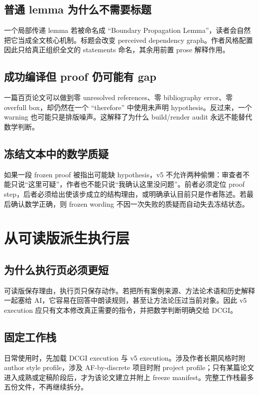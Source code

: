 \documentclass[UTF8,fontset=none,12pt,openany]{ctexbook}
\begin{document}
\section{普通 lemma 为什么不需要标题}

一个局部传递 lemma 若被命名成 “Boundary Propagation Lemma”，读者会自然把它当成全文核心机制。标题会改变 perceived dependency graph。作者风格配置因此只给真正组织全文的 statements 命名，其余用前置 prose 解释作用。

\section{成功编译但 proof 仍可能有 gap}

一篇百页论文可以做到零 unresolved references、零 bibliography error、零 overfull box，却仍然在一个 “therefore” 中使用未声明 hypothesis。反过来，一个 warning 也可能只是排版噪声。这解释了为什么 build/render audit 永远不能替代数学判断。

\section{冻结文本中的数学质疑}

如果一段 frozen proof 被指出可能缺 hypothesis，v5 不允许两种偷懒：审查者不能只说“这里可疑”，作者也不能只说“我确认这里没问题”。前者必须定位 proof step，后者必须给出使该步成立的结构理由，或明确承认目前只是作者陈述。若最后确认数学正确，则 frozen wording 不因一次失败的质疑而自动失去冻结状态。

\chapter{从可读版派生执行层}

\section{为什么执行页必须更短}

可读版保存理由，执行页只保存动作。若把所有案例来源、方法论术语和历史解释一起塞给 AI，它容易在回答中朗读规则，甚至让方法论压过当前对象。因此 v5 execution 应只有文本修改真正需要的指令，并把数学判断明确交给 DCGI。

\section{固定工作栈}

日常使用时，先加载 DCGI execution 与 v5 execution。涉及作者长期风格时附 author style profile，涉及 AF-by-discrete 项目时附 project profile；只有某篇论文进入成熟或定稿阶段后，才为该论文建立并附上 freeze manifest。完整工作栈最多五份文件，不再继续拆分。
\end{document}
